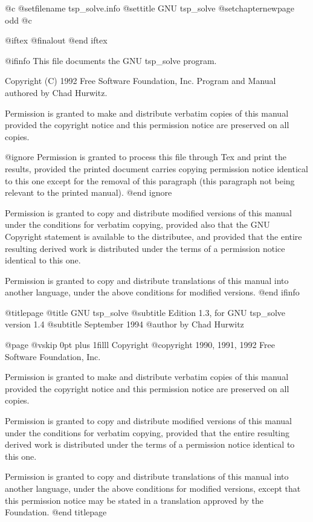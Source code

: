 
@c %
@setfilename tsp_solve.info
@settitle GNU tsp_solve
@setchapternewpage odd
@c %

@iftex
@finalout
@end iftex

@ifinfo
This file documents the GNU tsp_solve program.

Copyright (C) 1992 Free Software Foundation, Inc.
Program and Manual authored by Chad Hurwitz.

Permission is granted to make and distribute verbatim copies of this
manual provided the copyright notice and this permission notice are
preserved on all copies.

@ignore
Permission is granted to process this file through Tex and print the
results, provided the printed document carries copying permission notice
identical to this one except for the removal of this paragraph (this
paragraph not being relevant to the printed manual).
@end ignore

Permission is granted to copy and distribute modified versions of this
manual under the conditions for verbatim copying, provided also that the
GNU Copyright statement is available to the distributee, and provided
that the entire resulting derived work is distributed under the terms of
a permission notice identical to this one.

Permission is granted to copy and distribute translations of this manual
into another language, under the above conditions for modified versions.
@end ifinfo

@titlepage
@title GNU tsp_solve
@subtitle Edition 1.3, for GNU tsp_solve version 1.4
@subtitle September 1994
@author by Chad Hurwitz

@page
@vskip 0pt plus 1filll
Copyright @copyright{} 1990, 1991, 1992 Free Software Foundation, Inc.

Permission is granted to make and distribute verbatim copies of
this manual provided the copyright notice and this permission notice
are preserved on all copies.

Permission is granted to copy and distribute modified versions of this
manual under the conditions for verbatim copying, provided that the entire
resulting derived work is distributed under the terms of a permission
notice identical to this one.

Permission is granted to copy and distribute translations of this manual
into another language, under the above conditions for modified versions,
except that this permission notice may be stated in a translation approved
by the Foundation.
@end titlepage

